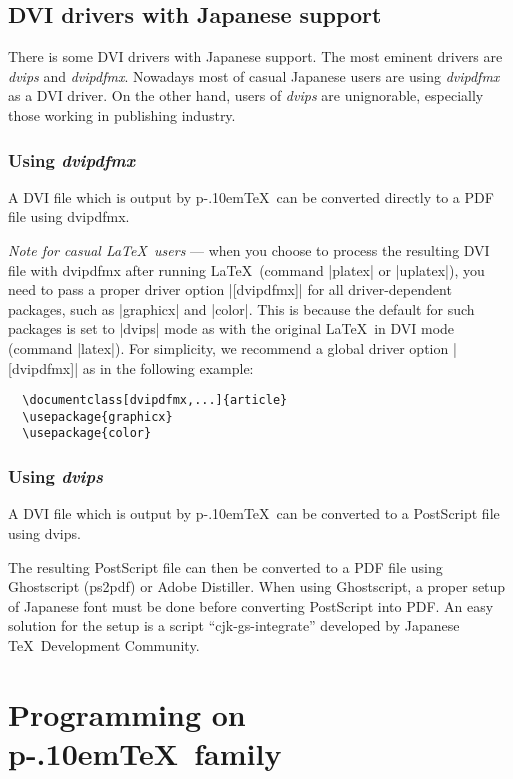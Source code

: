 \documentclass[a4paper,11pt]{article}
\def\pTeX{p\kern-.10em\TeX}
\begin{document}
\subsection{DVI drivers with Japanese support}

There is some DVI drivers with Japanese support.
The most eminent drivers are {\em dvips} and {\em dvipdfmx}.
Nowadays most of casual Japanese users are using {\em dvipdfmx} as a DVI driver.
On the other hand, users of {\em dvips} are unignorable, especially those
working in publishing industry.

\subsubsection{Using {\em dvipdfmx}}

A DVI file which is output by \pTeX\ can be converted directly to a PDF file
using dvipdfmx.

{\em Note for casual \LaTeX\ users} ---
when you choose to process the resulting DVI file with dvipdfmx
after running \LaTeX\ (command |platex| or |uplatex|),
you need to pass a proper driver option |[dvipdfmx]| for
all driver-dependent packages, such as |graphicx| and |color|.
This is because the default for such packages is set to |dvips| mode
as with the original \LaTeX\ in DVI mode (command |latex|).
For simplicity, we recommend a global driver option |[dvipdfmx]|
as in the following example:
\begin{verbatim}
  \documentclass[dvipdfmx,...]{article}
  \usepackage{graphicx}
  \usepackage{color}
\end{verbatim}

\subsubsection{Using {\em dvips}}

A DVI file which is output by \pTeX\ can be converted to a PostScript file
using dvips.

The resulting PostScript file can then be converted to
a PDF file using Ghostscript (ps2pdf) or Adobe Distiller.
When using Ghostscript, a proper setup of Japanese font must be done
before converting PostScript into PDF.
An easy solution for the setup is a script ``cjk-gs-integrate''
developed by Japanese \TeX\ Development Community.

\section{Programming on \pTeX\ family}
\end{document}
